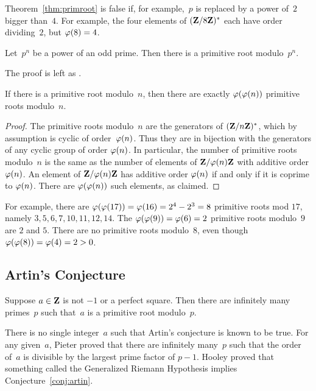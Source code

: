 \begin{example}
Theorem~\ref{thm:primroot} is false if, for example,~$p$ is replaced by a
power of~$2$ bigger than~$4$.  For example, the four elements of
$(\mathbf{Z}/8\mathbf{Z}{})^*$ each have order dividing~$2$, but $\varphi(8)=4$.
\end{example}

\begin{theorem}\label{theorem:cyclic}
Let~$p^n$ be a power of an odd prime.  Then there
is a primitive root modulo~$p^n$.
\end{theorem}
The proof is left as .

\begin{proposition}
If there is a primitive root modulo~$n$,
then there are exactly $\varphi(\varphi(n))$ primitive roots modulo~$n$.
\end{proposition}
\begin{proof}
The primitive roots modulo~$n$ are the generators of
$(\mathbf{Z}/n\mathbf{Z}{})^*$, which by assumption is cyclic of order~$\varphi(n)$.
Thus they are in bijection with the generators of any cyclic group
of order $\varphi(n)$.  In particular, the number of primitive roots
modulo~$n$ is the same as the number of elements of $\mathbf{Z}/\varphi(n)\mathbf{Z}{}$
with additive order $\varphi(n)$.  An element of $\mathbf{Z}/\varphi(n)\mathbf{Z}{}$ has additive
order $\varphi(n)$ if and only if it is coprime to $\varphi(n)$.  There
are $\varphi(\varphi(n))$ such elements, as claimed.
\end{proof}

\begin{example}\label{example:primitive}
For example, there are $\varphi(\varphi(17)) = \varphi(16)=2^4-2^3=8$
primitive roots mod $17$, namely $3, 5, 6, 7, 10, 11, 12, 14$.  The
$\varphi(\varphi(9)) = \varphi(6) = 2$ primitive roots modulo~$9$ are $2$
and $5$.  There are no primitive roots modulo~$8$, even though
$\varphi(\varphi(8)) = \varphi(4) = 2>0$.
\end{example}


\subsection{Artin's Conjecture}%
\begin{conjecture}\label{conj:artin}
Suppose $a\in\mathbf{Z}$ is not $-1$ or a perfect square.  Then there are
infinitely many primes~$p$ such that~$a$ is a primitive root
modulo~$p$.
\end{conjecture}
There is no single integer~$a$ such that Artin's conjecture is known
to be true.  For any given~$a$, Pieter
\cite{pieter:artin} proved that there are infinitely
many~$p$ such that the order of~$a$ is divisible by the largest prime
factor of $p-1$.  Hooley \cite{hooley:artin} proved that
something called the Generalized Riemann Hypothesis implies Conjecture~\ref{conj:artin}.

